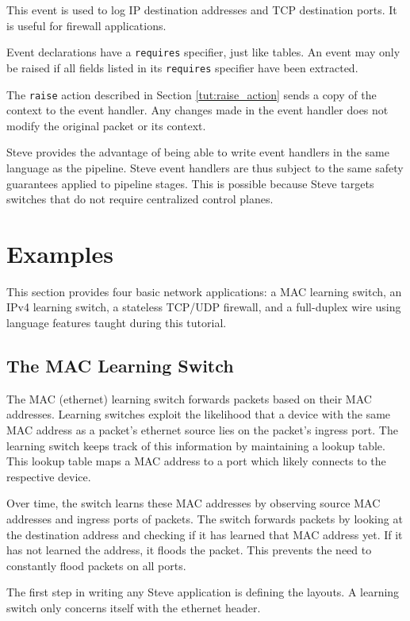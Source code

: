 This event is used to log IP destination addresses and
TCP destination ports. It is useful for firewall applications.

Event declarations have a \texttt{requires} specifier, just
like tables. An event may only be raised if all fields listed in its
\texttt{requires} specifier have been extracted.

The \texttt{raise} action described in Section \ref{tut:raise_action}
sends a copy of the context to the event handler.
Any changes made in the event handler does not modify the
original packet or its context.

Steve provides the advantage of being able to write event handlers
in the same language as the pipeline. 
Steve event handlers are thus subject to the same safety
guarantees applied to pipeline stages.
This is possible because Steve targets switches that do not require
centralized control planes.

\section{Examples} \label{tut:examples}

This section provides four basic network applications: a MAC learning switch, an IPv4 learning switch, a stateless TCP/UDP firewall, and a
full-duplex wire using language features taught during this tutorial.

\subsection{The MAC Learning Switch} \label{tut:learning_switch}

The MAC (ethernet) learning switch forwards packets based on their MAC addresses. Learning switches exploit the likelihood that a device with the same MAC address
as a packet's ethernet source lies on the packet's ingress port. 
The learning switch keeps track of this information by maintaining a lookup table. This lookup table maps a MAC address to a port which likely connects to the respective device. 

Over time, the switch learns these MAC addresses by observing source MAC addresses and ingress ports of packets. The switch forwards packets by
looking at the destination address and checking if it has learned that MAC
address yet. If it has not learned the address, it floods the packet. This prevents the need to constantly flood packets on all ports.

The first step in writing any Steve application is defining the layouts. A
learning switch only concerns itself with the ethernet header.

